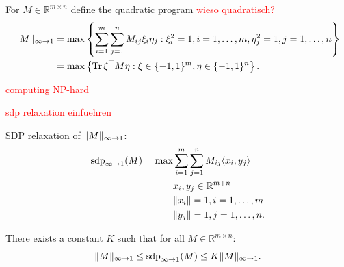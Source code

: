 \begin{dfn}
	For $M\in\mathbb{R}^{m\times n}$ define the quadratic program \textcolor{red}{wieso quadratisch?}
	\begin{align}
		 \Vert {M} \Vert_{\infty\to 1} &= \max \left\{ \sum_{i=1}^m \sum_{j=1}^n M_{ij} \xi_i \eta_j : \xi_i^2=1, i=1,\dots,m, \eta_j^2=1, j =1,\dots,n \right\} \\
		&=\max\left\{\text{Tr} \, {\xi^\top M \eta} : \xi\in\{-1,1\}^m,\eta\in\{-1,1\}^n\right\}.
	\end{align}
\end{dfn}
\textcolor{red}{computing NP-hard}
\begin{dfn}
	\textcolor{red}{sdp relaxation einfuehren}
	
	SDP relaxation of $ \Vert {M} \Vert_{\infty\to1}$:
	\begin{align*}
		\operatorname{sdp}_{\infty\to 1} (M) = \max 
		&\sum_{i=1}^m\sum_{j=1}^n M_{ij} \langle{x_i},{y_j}\rangle\\
		&x_i,y_j\in\mathbb{R}^{m+n}\\
		& \Vert {x_i} \Vert=1, i=1,\dots,m\\
		& \Vert {y_j} \Vert=1, j=1,\dots,n.
	\end{align*}
\end{dfn}
\begin{theo} \label{theo:G_ineq}
	There exists a constant $K$ such that for all $M\in\mathbb{R}^{m\times n}$:
	\begin{equation}
		 \Vert {M} \Vert_{\infty\to 1} \leq \operatorname{sdp}_{\infty\to 1} (M) \leq K  \Vert {M} \Vert_{\infty\to 1}.
	\end{equation}
\end{theo}
